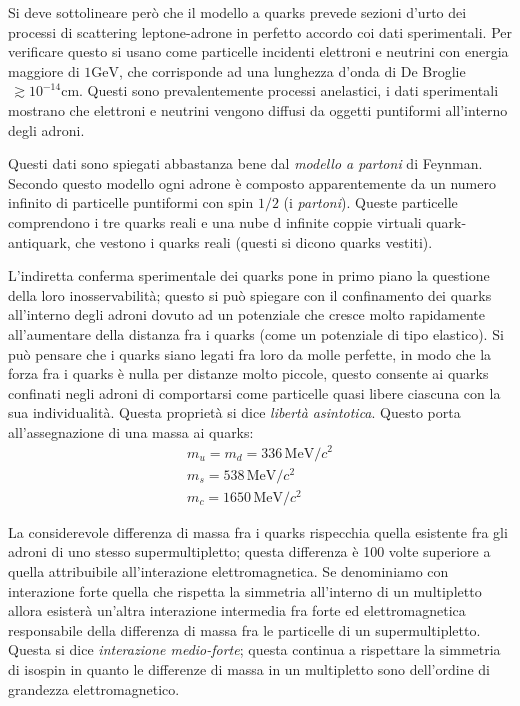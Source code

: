 Si deve sottolineare però che il modello a quarks prevede sezioni d'urto dei processi di scattering leptone-adrone
in perfetto accordo coi dati sperimentali.
Per verificare questo si usano come particelle incidenti elettroni e neutrini con energia maggiore
di $1\si{\giga\electronvolt}$, che corrisponde ad una lunghezza d'onda di De Broglie \textcrlambda$\,\gtrsim
10^{-14}\si{\centi\meter}$.
Questi sono prevalentemente processi anelastici, i dati sperimentali mostrano che elettroni e neutrini
vengono diffusi da oggetti puntiformi all'interno degli adroni.

Questi dati sono spiegati abbastanza bene dal \textit{modello a partoni} di Feynman. Secondo questo modello
ogni adrone è composto apparentemente da un numero infinito di particelle puntiformi con spin $1/2$ (i
\textit{partoni}).
Queste particelle comprendono i tre quarks reali e una nube d infinite coppie virtuali quark-antiquark, che vestono
i quarks reali (questi si dicono quarks vestiti).

L'indiretta conferma sperimentale dei quarks pone in primo piano la questione della loro inosservabilità; questo si
può spiegare con il confinamento dei quarks all'interno degli adroni dovuto ad un potenziale che cresce molto
rapidamente all'aumentare della distanza fra i quarks (come un potenziale di tipo elastico).
Si può pensare che i quarks siano legati fra loro da molle perfette, in modo che la forza fra i quarks è nulla
per distanze molto piccole, questo consente ai quarks confinati negli adroni di comportarsi come particelle quasi
libere ciascuna con la sua individualità.
Questa proprietà si dice \textit{libertà asintotica}. Questo porta all'assegnazione di una massa ai quarks:
\begin{gather}
m_u=m_d=336\,\si{\mega\electronvolt}/c^2\\
m_s=538\,\si{\mega\electronvolt}/c^2\\
m_c=1650\,\si{\mega\electronvolt}/c^2
\end{gather}

La considerevole differenza di massa fra i quarks rispecchia quella esistente fra gli adroni di uno stesso supermultipletto;
questa differenza è 100 volte superiore a quella attribuibile all'interazione elettromagnetica.
Se denominiamo con interazione forte quella che rispetta la simmetria all'interno di un multipletto allora
esisterà un'altra interazione intermedia fra forte ed elettromagnetica responsabile della differenza di massa fra
le particelle di un supermultipletto.
Questa si dice \textit{interazione medio-forte}; questa continua a rispettare la simmetria di isospin in quanto le
differenze di massa in un multipletto sono dell'ordine di grandezza elettromagnetico.


